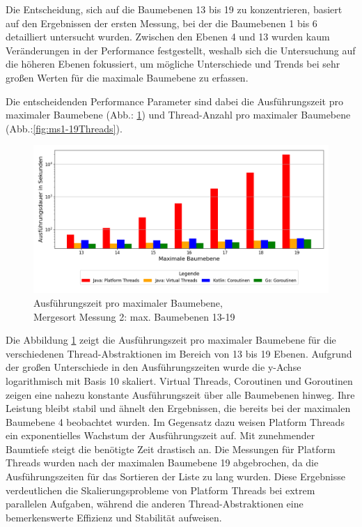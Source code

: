 \documentclass[fontsize=12pt,paper=a4,twoside=semi,parskip=half-,headsepline,headinclude]{scrreprt}
\begin{document}
Die Entscheidung, sich auf die Baumebenen 13 bis 19 zu konzentrieren, basiert auf den Ergebnissen der ersten Messung, bei der die Baumebenen 1 bis 6 detailliert untersucht wurden. Zwischen den Ebenen 4 und 13 wurden kaum Veränderungen in der Performance festgestellt, weshalb sich die Untersuchung auf die höheren Ebenen  fokussiert, um mögliche Unterschiede und Trends bei sehr großen Werten für die maximale Baumebene zu erfassen.

Die entscheidenden Performance Parameter sind dabei die Ausführungszeit pro maximaler Baumebene (Abb.: \ref{fig:ms1-19Zeit}) und Thread-Anzahl pro maximaler Baumebene (Abb.:\ref{fig:ms1-19Threads}).

\begin{figure}[H]
	\centering
	\includegraphics[scale=0.48]{figures/mergesort/Maximalebauebenen1-19_pvcg/execution_time_plot.png}
	\caption{Ausführungszeit pro maximaler Baumebene,\\ Mergesort Messung 2: max. Baumebenen 13-19}
	\label{fig:ms1-19Zeit}
\end{figure}

Die Abbildung \ref{fig:ms1-19Zeit} zeigt die Ausführungszeit pro maximaler Baumebene für die verschiedenen Thread-Abstraktionen im Bereich von 13 bis 19 Ebenen. Aufgrund der großen Unterschiede in den Ausführungszeiten wurde die y-Achse logarithmisch mit Basis 10 skaliert. Virtual Threads, Coroutinen und Goroutinen zeigen eine nahezu konstante Ausführungszeit über alle Baumebenen hinweg. Ihre Leistung bleibt stabil und ähnelt den Ergebnissen, die bereits bei der maximalen Baumebene 4 beobachtet wurden. Im Gegensatz dazu weisen Platform Threads ein exponentielles Wachstum der Ausführungszeit auf. Mit zunehmender Baumtiefe steigt die benötigte Zeit drastisch an. Die Messungen für Platform Threads wurden nach der maximalen Baumebene 19 abgebrochen, da die Ausführungszeiten für das Sortieren der Liste zu lang wurden. Diese Ergebnisse verdeutlichen die Skalierungsprobleme von Platform Threads bei extrem parallelen Aufgaben, während die anderen Thread-Abstraktionen eine bemerkenswerte Effizienz und Stabilität aufweisen.
\end{document}
